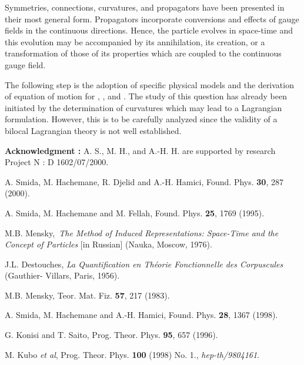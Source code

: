 \documentclass[12pt,a4paper]{article}
\begin{document}
Symmetries, connections, curvatures, and propagators have been presented in
their most general form. Propagators incorporate conversions and effects of
gauge fields in the continuous directions. Hence, the particle evolves in
space-time and this evolution may be accompanied by its annihilation, its
creation, or a transformation of those of its properties which are coupled to
the continuous gauge field.

The following step is the adoption of specific physical models and the
derivation of equation of motion for \coordHE{}, \coordHE{}, and \coordHE{}. The study of
this question has already been initiated by the determination of curvatures
which may lead to a Lagrangian formulation. However, this is to be carefully
analyzed since the validity of a bilocal Lagrangian theory is not well established.

\textbf{Acknowledgment :} A. S., M. H., and A.-H. H. are supported by research
Project N\myHighlight{${{}^{\circ}}$}\coordHE{} : D 1602/07/2000.

\begin{thebibliography}{99}
A. Smida, M. Hachemane, R. Djelid and A.-H. Hamici, Found.
Phys. \textbf{30}, 287 (2000).

A. Smida, M. Hachemane and M. Fellah, Found. Phys.
\textbf{25}, 1769 (1995).

M.B. Mensky,\textit{\ The Method of Induced
Representations: Space-Time and the Concept of Particles} [in Russian] (Nauka,
Moscow, 1976).

J.L. Destouches, \textit{La Quantification en
Th\'{e}orie Fonctionnelle des Corpuscules} (Gauthier- Villars, Paris, 1956).

M.B. Mensky, Teor. Mat. Fiz. \textbf{57}, 217 (1983).

A. Smida, M. Hachemane and A.-H. Hamici, Found. Phys.
\textbf{28}, 1367 (1998).

G. Konisi and T. Saito, Prog. Theor. Phys. \textbf{95},
657 (1996).

M. Kubo \textit{et al}, Prog. Theor. Phys. \textbf{100}
(1998) No. 1., \textit{hep-th/9804161}.
\end{thebibliography}
\end{document}
